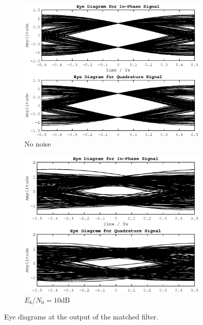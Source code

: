 \documentclass[paper=a4, fontsize=11pt]{scrartcl}	%
\numberwithin{equation}{section}		%
\numberwithin{figure}{section}			%
\numberwithin{table}{section}			%
\begin{document}
\begin{figure}
\centering
\begin{subfigure}{.5\textwidth}
  \centering
  \includegraphics[width=1\linewidth]{matp_EyeClean.eps}
  \caption{No noise}
  \label{fig:eyeClean}
\end{subfigure}%
\begin{subfigure}{.5\textwidth}
  \centering
  \includegraphics[width=1\linewidth]{matp_Eye10dB.eps}
  \caption{$E_b/N_0 = 10\text{dB}$}
  \label{fig:eyeDirty}
\end{subfigure}
\caption{Eye diagrams at the output of the matched filter.}
\label{fig:test}
\end{figure}
\end{document}

